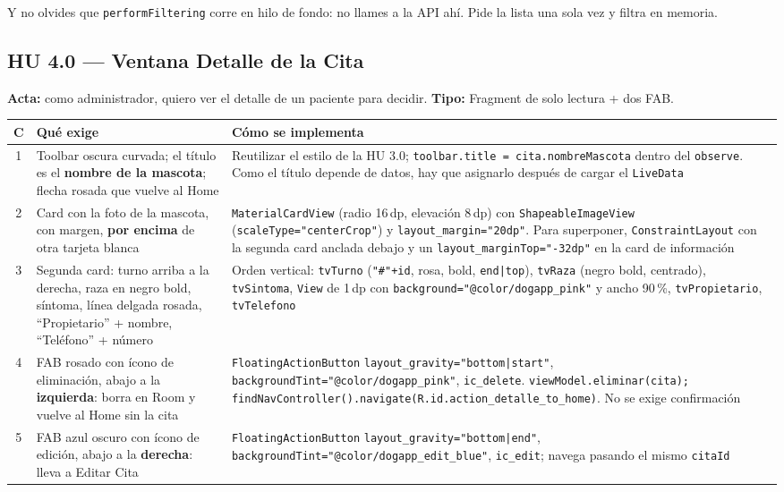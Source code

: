 \documentclass[11pt,letterpaper]{article}
\newcommand{\code}[1]{\texttt{\small #1}}
\begin{document}
\noindent Y no olvides que \code{performFiltering} corre en hilo de fondo: no
llames a la API ah\'i. Pide la lista una sola vez y filtra en memoria.

\subsection{HU 4.0 --- Ventana Detalle de la Cita}

\textbf{Acta:} como administrador, quiero ver el detalle de un paciente para
decidir. \textbf{Tipo:} Fragment de solo lectura + dos FAB.

\begin{center}
\footnotesize
\begin{tabularx}{\linewidth}{@{}c X X@{}}
\toprule
\textbf{C} & \textbf{Qu\'e exige} & \textbf{C\'omo se implementa}\\
\midrule
1 & Toolbar oscura curvada; el t\'itulo es el \textbf{nombre de la mascota}; flecha rosada que vuelve al Home & Reutilizar el estilo de la HU 3.0; \code{toolbar.\allowbreak{}title =\allowbreak{} cita.nombreMascota} dentro del \code{observe}. Como el t\'itulo depende de datos, hay que asignarlo despu\'es de cargar el \code{LiveData}\\
2 & Card con la foto de la mascota, con margen, \textbf{por encima} de otra tarjeta blanca & \code{MaterialCardView} (radio 16\,dp, elevaci\'on 8\,dp) con \code{ShapeableImageView} (\code{scaleType=\allowbreak{}"centerCrop"}) y \code{layout\_margin=\allowbreak{}"20dp"}. Para superponer, \code{ConstraintLayout} con la segunda card anclada debajo y un \code{layout\_marginTop=\allowbreak{}"-32dp"} en la card de informaci\'on\\
3 & Segunda card: turno arriba a la derecha, raza en negro bold, s\'intoma, l\'inea delgada rosada, ``Propietario'' + nombre, ``Tel\'efono'' + n\'umero & Orden vertical: \code{tvTurno} (\code{"\#"+id}, rosa, bold, \code{end|top}), \code{tvRaza} (negro bold, centrado), \code{tvSintoma}, \code{View} de 1\,dp con \code{background=\allowbreak{}"@color/\allowbreak{}dogapp\_pink"} y ancho 90\,\%, \code{tvPropietario}, \code{tvTelefono}\\
4 & FAB rosado con \'icono de eliminaci\'on, abajo a la \textbf{izquierda}: borra en Room y vuelve al Home sin la cita & \code{FloatingActionButton} \code{layout\_gravity=\allowbreak{}"bottom|start"}, \code{backgroundTint=\allowbreak{}"@color/\allowbreak{}dogapp\_pink"}, \code{ic\_delete}. \code{viewModel.\allowbreak{}eliminar(\allowbreak{}cita); findNavController(\allowbreak{}).navigate(\allowbreak{}R.id.action\_detalle\_to\_home)}. No se exige confirmaci\'on\\
5 & FAB azul oscuro con \'icono de edici\'on, abajo a la \textbf{derecha}: lleva a Editar Cita & \code{FloatingActionButton} \code{layout\_gravity=\allowbreak{}"bottom|end"}, \code{backgroundTint=\allowbreak{}"@color/\allowbreak{}dogapp\_edit\_blue"}, \code{ic\_edit}; navega pasando el mismo \code{citaId}\\
\bottomrule
\end{tabularx}
\end{center}
\end{document}
